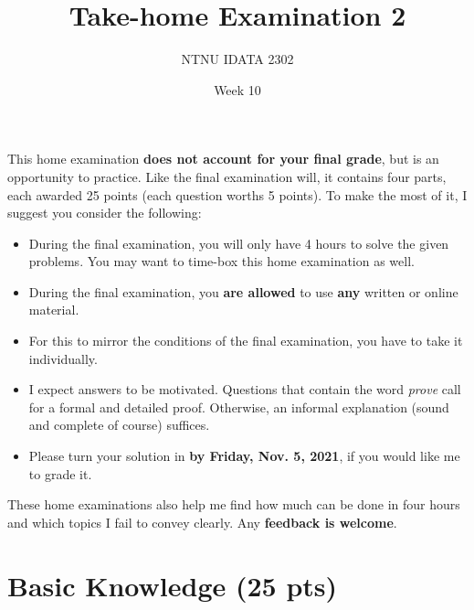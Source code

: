 \documentclass[11pt]{article}
\author{NTNU IDATA 2302}
\date{Week 10}
\title{Take-home Examination 2}
\begin{document}
\maketitle
This home examination \textbf{does not account for your final grade}, but is
an opportunity to practice. Like the final examination will, it
contains four parts, each awarded 25 points (each question worths 5
points). To make the most of it, I suggest you consider the following:
\begin{itemize}
\item During the final examination, you will only have 4 hours to solve
the given problems. You may want to time-box this home examination
as well.
\item During the final examination, you \textbf{are allowed} to use \textbf{any}
written or online material.
\item For this to mirror the conditions of the final examination, you
have to take it individually.
\item I expect answers to be motivated. Questions that contain the word
\emph{prove} call for a formal and detailed proof. Otherwise, an
informal explanation (sound and complete of course) suffices.
\item Please turn your solution in \textbf{by Friday, Nov. 5, 2021}, if you
would like me to grade it.
\end{itemize}

These home examinations also help me find how much can be done in four
hours and which topics I fail to convey clearly. Any \textbf{feedback is
welcome}.

\section{Basic Knowledge (25 pts)}
\label{sec:orgc041c99}
\end{document}
